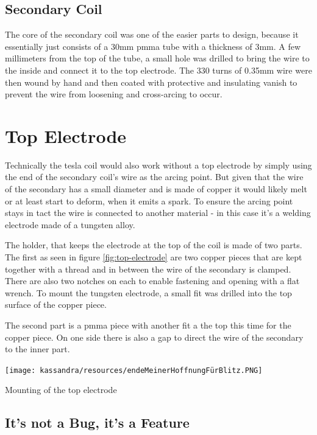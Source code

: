 \subsection{Secondary Coil}

The core of the secondary coil was one of the easier parts to design, because it essentially just consists of a 30mm \gls{pmma} tube with a thickness of 3mm. A few millimeters from the top of the tube, a small hole was drilled to bring the wire to the inside and connect it to the top electrode. The 330 turns of 0.35mm wire were then wound by hand and then coated with protective and insulating vanish to prevent the wire from loosening and cross-arcing to occur.


\section{Top Electrode}

Technically the tesla coil would also work without a top electrode by simply using the end of the secondary coil's wire as the arcing point. But given that the wire of the secondary has a small diameter and is made of copper it would likely melt or at least start to deform, when it emits a spark. To ensure the arcing point stays in tact the wire is connected to another material - in this case it's a welding electrode made of a tungsten alloy. 

The holder, that keeps the electrode at the top of the coil is made of two parts. The first as seen in figure \ref{fig:top-electrode} are two copper pieces that are kept together with a thread and in between the wire of the secondary is clamped. There are also two notches on each to enable fastening and opening with a flat wrench. To mount the tungsten electrode, a small fit was drilled into the top surface of the copper piece. 

The second part is a \gls{pmma} piece with another fit a the top this time for the copper piece. On one side there is also a gap to direct the wire of the secondary to the inner part. 

\begin{marginfigure}[-8cm]
    \centering
    \texttt{[image: kassandra/resources/endeMeinerHoffnungFürBlitz.PNG]}
    \caption{Mounting of the top electrode}
    \label{fig:top-electrode}
\end{marginfigure}

\subsection{It's not a Bug, it's a Feature}

